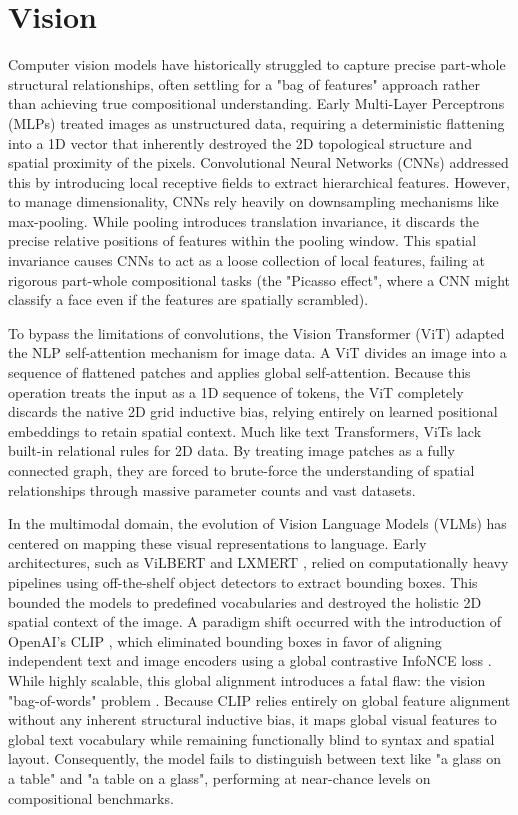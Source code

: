 \documentclass[12pt, a4paper, oneside]{report}
\begin{document}
\section{Vision}

Computer vision models have historically struggled to capture precise part-whole structural relationships, often settling for a "bag of features" approach rather than achieving true compositional understanding. Early Multi-Layer Perceptrons (MLPs) \cite{mlp} treated images as unstructured data, requiring a deterministic flattening into a 1D vector that inherently destroyed the 2D topological structure and spatial proximity of the pixels. Convolutional Neural Networks (CNNs) \cite{cnn} addressed this by introducing local receptive fields to extract hierarchical features. However, to manage dimensionality, CNNs rely heavily on downsampling mechanisms like max-pooling. While pooling introduces translation invariance, it discards the precise relative positions of features within the pooling window. This spatial invariance causes CNNs to act as a loose collection of local features, failing at rigorous part-whole compositional tasks (the "Picasso effect", where a CNN might classify a face even if the features are spatially scrambled).

To bypass the limitations of convolutions, the Vision Transformer (ViT) \cite{vit} adapted the NLP self-attention mechanism for image data. A ViT divides an image into a sequence of flattened patches and applies global self-attention. Because this operation treats the input as a 1D sequence of tokens, the ViT completely discards the native 2D grid inductive bias, relying entirely on learned positional embeddings to retain spatial context. Much like text Transformers, ViTs lack built-in relational rules for 2D data. By treating image patches as a fully connected graph, they are forced to brute-force the understanding of spatial relationships through massive parameter counts and vast datasets.

In the multimodal domain, the evolution of Vision Language Models (VLMs) has centered on mapping these visual representations to language. Early architectures, such as ViLBERT \cite{vilbert} and LXMERT \cite{lxmert}, relied on computationally heavy pipelines using off-the-shelf object detectors to extract bounding boxes. This bounded the models to predefined vocabularies and destroyed the holistic 2D spatial context of the image. A paradigm shift occurred with the introduction of OpenAI's CLIP \cite{clip}, which eliminated bounding boxes in favor of aligning independent text and image encoders using a global contrastive InfoNCE loss \cite{infonce}. While highly scalable, this global alignment introduces a fatal flaw: the vision "bag-of-words" problem \cite{aro}. Because CLIP relies entirely on global feature alignment without any inherent structural inductive bias, it maps global visual features to global text vocabulary while remaining functionally blind to syntax and spatial layout. Consequently, the model fails to distinguish between text like "a glass on a table" and "a table on a glass", performing at near-chance levels on compositional benchmarks.
\end{document}

